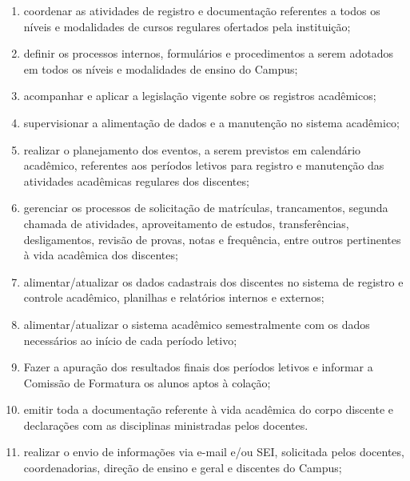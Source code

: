 \documentclass[a4paper,12pt]{report}
\begin{document}
\begin{enumerate}
\renewcommand{\labelenumi}{\Roman{enumi}}

\item coordenar as atividades de registro e documentação referentes a todos os níveis e 
      modalidades de cursos regulares ofertados pela instituição;

\item definir os processos internos, formulários e procedimentos a serem adotados em todos 
      os níveis e modalidades de ensino do Campus;

\item acompanhar e aplicar a legislação vigente sobre os registros acadêmicos;

\item supervisionar a alimentação de dados e a manutenção no sistema acadêmico;

\item realizar o planejamento dos eventos, a serem previstos em calendário acadêmico,  
      referentes aos períodos letivos para registro e manutenção das atividades acadêmicas 
      regulares dos discentes;

\item gerenciar os processos de solicitação de matrículas, trancamentos, segunda chamada de         
      atividades, aproveitamento de estudos, transferências, desligamentos, revisão de 
      provas, notas e frequência, entre outros pertinentes à vida acadêmica dos discentes;

\item alimentar/atualizar os dados cadastrais dos discentes no sistema de registro e 
      controle acadêmico, planilhas e relatórios internos e externos;

\item alimentar/atualizar o sistema acadêmico semestralmente com os dados necessários ao 
      início de cada período letivo;

\item Fazer a apuração dos resultados finais dos períodos letivos e informar a Comissão de 
      Formatura os alunos aptos à colação;

\item emitir toda a documentação referente à vida acadêmica do corpo discente e declarações 
      com as disciplinas ministradas pelos docentes.

\item realizar o envio de informações via e-mail e/ou SEI, solicitada pelos docentes, 
      coordenadorias, direção de ensino e geral e discentes do Campus;


\end{enumerate}
\end{document}
